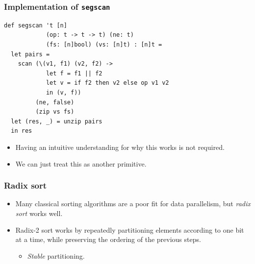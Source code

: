 \begin{frame}[fragile]
  \frametitle{Implementation of \texttt{segscan}}

\begin{lstlisting}
def segscan 't [n]
            (op: t -> t -> t) (ne: t)
            (fs: [n]bool) (vs: [n]t) : [n]t =
  let pairs =
    scan (\(v1, f1) (v2, f2) ->
            let f = f1 || f2
            let v = if f2 then v2 else op v1 v2
            in (v, f))
         (ne, false)
         (zip vs fs)
  let (res, _) = unzip pairs
  in res
\end{lstlisting}

  \begin{itemize}
  \item Having an intuitive understanding for why this works is not required.
  \item We can just treat this as another primitive.
  \end{itemize}

\end{frame}

\begin{frame}
  \frametitle{Radix sort}

  \begin{itemize}
  \item Many classical sorting algorithms are a poor fit for data
    parallelism, but \textit{radix sort} works well.
  \item Radix-2 sort works by repeatedly partitioning elements
    according to one bit at a time, while preserving the ordering of
    the previous steps.
    \begin{itemize}
    \item[+] \emph{Stable} partitioning.
    \end{itemize}
  \end{itemize}

\end{frame}

